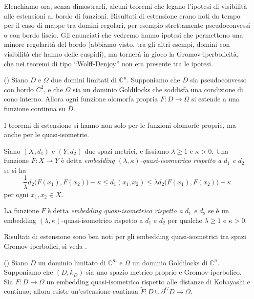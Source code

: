 Elenchiamo ora, senza dimostrarli, alcuni teoremi che legano l'ipotesi di visibilità alle estensioni al bordo di funzioni. Risultati di estensione erano noti da tempo per il caso di mappe tra domini regolari, per esempio strettamente pseudoconvessi o con bordo liscio. Gli enunciati che vedremo hanno ipotesi che permettono una minore regolarità del bordo (abbiamo visto, tra gli altri esempi, domini con visibilità che hanno delle cuspidi), ma tornerà in gioco la Gromov-iperbolicità, che nei teoremi di tipo ``Wolff-Denjoy'' non era presente tra le ipotesi.

\begin{thm}
    (\cite[Theorem 1.5]{BZ1}) Siano $D$ e $\Omega$ due domini limitati di $\mathbb{C}^n$. Supponiamo che $D$ sia pseudoconvesso con bordo $C^2$, e che $\Omega$ sia un dominio Goldilocks che soddisfa una condizione di cono interno. Allora ogni funzione olomorfa propria $F:D\longrightarrow\Omega$ si estende a una funzione continua su $\overline{D}$.
\end{thm}

I teoremi di estensione si hanno non solo per le funzioni olomorfe proprie, ma anche per le quasi-isometrie.

\begin{defn}
    Siano $(X,d_1)$ e $(Y,d_2)$ due spazi metrici, e fissiamo $\lambda\ge 1$ e $\kappa>0$. Una funzione $F:X\longrightarrow Y$ è detta \textit{embedding $(\lambda,\kappa)$-quasi-isometrico rispetto a $d_1$ e $d_2$} se si ha
    $$\frac{1}{\lambda}d_2\big(F(x_1),F(x_2)\big)-\kappa \le d_1(x_1,x_2) \le \lambda d_2\big(F(x_1),F(x_2)\big)+\kappa$$
    per ogni $x_1,x_2\in X$.
    
    La funzione $F$ è detta \textit{embedding quasi-isometrico rispetto a $d_1$ e $d_2$} se è un embedding $(\lambda,\kappa)$-quasi-isometrico rispetto a $d_1$ e $d_2$ per qualche $\lambda\ge 1$ e $\kappa>0$.
\end{defn}
\vspace*{-\baselineskip}

Risultati di estensione sono ben noti per gli embedding quasi-isometrici tra spazi Gromov-iperbolici, si veda \cite[Part III, Chapter H, Theorem 3.9]{BH}.

\begin{thm}
    (\cite[Theorem 1.7]{BZ1}) Siano $D$ un dominio limitato di $\mathbb{C}^m$ e $\Omega$ un dominio Goldilocks di $\mathbb{C}^n$. Supponiamo che $(D,k_D)$ sia uno spazio metrico proprio e Gromov-iperbolico. Sia $F:D\longrightarrow\Omega$ un embedding quasi-isometrico rispetto alle distanze di Kobayashi e continuo; allora esiste un'estensione continua $\tilde{F}:D\cup\partial^GD\longrightarrow\overline{\Omega}$.
\end{thm}

